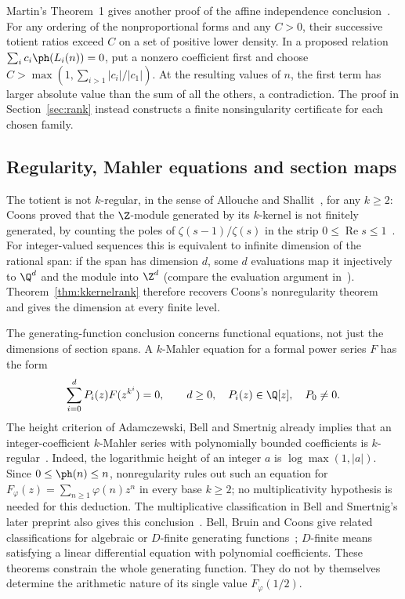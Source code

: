 \documentclass[11pt]{article}
\begin{document}
Martin's Theorem~1 gives another proof of the affine independence
conclusion~\cite[Thm.~1]{martin-phi-inequalities}. For any ordering of the nonproportional forms and any
$C>0$, their successive totient ratios exceed $C$ on a set of positive
lower density. In a proposed relation $\sum_i c_i\ph(L_i(n))=0$,
put a nonzero coefficient first and choose
$C>\max(1,\sum_{i>1}|c_i|/|c_1|)$. At the resulting values of $n$,
the first term has larger absolute value than the sum of all the
others, a contradiction. The proof in Section~\ref{sec:rank} instead constructs a finite
nonsingularity certificate for each chosen family.

\subsection*{Regularity, Mahler equations and section maps}
The totient is not $k$-regular, in the sense of Allouche and
Shallit~\cite{allouche-shallit}, for any $k\ge2$: Coons proved that the
$\Z$-module generated by its $k$-kernel is not finitely generated, by counting
the poles of $\zeta(s-1)/\zeta(s)$ in the strip
$0\le\operatorname{Re}s\le1$~\cite[Cor.~3.1, Thm.~3.2]{coons}. For
integer-valued sequences this is equivalent to infinite dimension of the
rational span: if the span has dimension $d$, some $d$ evaluations map it
injectively to $\Q^d$ and the module into $\Z^d$ (compare the evaluation
argument in~\cite[App.~A]{coons-jsr}). Theorem~\ref{thm:kkernelrank}
therefore recovers Coons's nonregularity theorem~\cite[Thm.~3.2]{coons}
and gives the dimension at every finite level.

The generating-function conclusion concerns functional equations, not
just the dimensions of section spans. A $k$-Mahler equation for a formal
power series $F$ has the form
\[
 \sum_{i=0}^{d}P_i(z)F(z^{k^i})=0,
 \qquad d\ge0,\quad P_i(z)\in\Q[z],\quad P_0\ne0.
\]
The height criterion of Adamczewski, Bell and Smertnig already implies
that an integer-coefficient $k$-Mahler series with polynomially bounded
coefficients is $k$-regular~\cite[Thm.~1.2(b), p.~2528]{adamczewski-bell-smertnig2023}.
Indeed, the logarithmic height of an integer $a$ is
$\log\max(1,|a|)$. Since $0\le\ph(n)\le n$, nonregularity rules out
such an equation for $F_\varphi(z)=\sum_{n\ge1}\varphi(n)z^n$ in every
base $k\ge2$; no multiplicativity hypothesis is needed for this deduction.
The multiplicative classification in Bell and Smertnig's later preprint
also gives this conclusion~\cite[Thm.~1.3]{bell-smertnig2026}.
Bell, Bruin and Coons give related classifications for algebraic or
$D$-finite generating functions~\cite[Thms.~1.5--1.6]{bell-bruin-coons};
$D$-finite means satisfying a linear differential equation with
polynomial coefficients.
These theorems constrain the whole generating function. They do not
by themselves determine the arithmetic nature of its single value
$F_\varphi(1/2)$.
\end{document}
